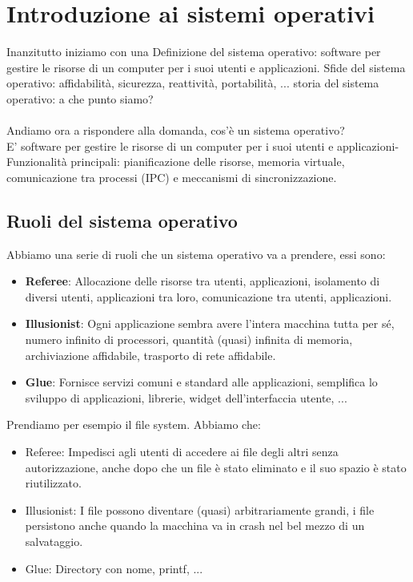 \newpage
\section{Introduzione ai sistemi operativi}
Inanzitutto iniziamo con una Definizione del sistema operativo: software per gestire le risorse di un computer per i suoi utenti e applicazioni. 
Sfide del sistema operativo: affidabilità, sicurezza, reattività, portabilità, ... storia del sistema operativo: a che punto siamo?
\\\\Andiamo ora a rispondere alla domanda, cos'è un sistema operativo?\\
E' software per gestire le risorse di un computer per i suoi utenti e applicazioni- Funzionalità principali: pianificazione delle risorse, memoria virtuale, comunicazione tra processi (IPC) 
e meccanismi di sincronizzazione.

\subsection{Ruoli del sistema operativo}
Abbiamo una serie di ruoli che un sistema operativo va a prendere, essi sono:
\begin{itemize}
    \item \textbf{Referee}: Allocazione delle risorse tra utenti, applicazioni, isolamento di diversi utenti, applicazioni tra loro, comunicazione tra utenti, applicazioni.
    \item \textbf{Illusionist}: Ogni applicazione sembra avere l'intera macchina tutta per sé, numero infinito di processori, quantità (quasi) infinita di memoria, archiviazione affidabile, trasporto di rete affidabile.
    \item \textbf{Glue}: Fornisce servizi comuni e standard alle applicazioni, semplifica lo sviluppo di applicazioni, librerie, widget dell'interfaccia utente, ...
\end{itemize}

\begin{example}
    Prendiamo per esempio il file system. Abbiamo che:
    \begin{itemize}
        \item Referee: Impedisci agli utenti di accedere ai file degli altri senza autorizzazione, anche dopo che un file è stato eliminato e il suo spazio è stato riutilizzato.
        \item Illusionist: I file possono diventare (quasi) arbitrariamente grandi, i file persistono anche quando la macchina va in crash nel bel mezzo di un salvataggio.
        \item Glue: Directory con nome, printf, ...
    \end{itemize}
\end{example}

